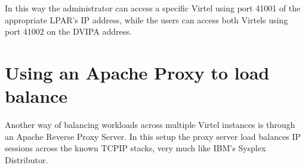 \documentclass[letterpaper,10pt,english]{sphinxmanual}
\begin{document}
\begin{sphinxVerbatim}[commandchars=\\\{\}]
 
 
    
      
    
    
    
   
\end{sphinxVerbatim}

\sphinxAtStartPar
In this way the administrator can access a specific Virtel using port 41001 of the appropriate LPAR’s IP address, while the users can access both Virtels using port 41002 on the DVIPA address.

\newpage

\ignorespaces 

\section{Using an Apache Proxy to load balance}
\label{\detokenize{connectivity_guide:using-an-apache-proxy-to-load-balance}}\label{\detokenize{connectivity_guide:index-181}}
\sphinxAtStartPar
Another way of balancing workloads across multiple Virtel instances is through an Apache Reverse Proxy Server. In this setup the proxy server load balances IP sessions across the known TCPIP stacks, very much like IBM’s Sysplex Distributor.
\end{document}
